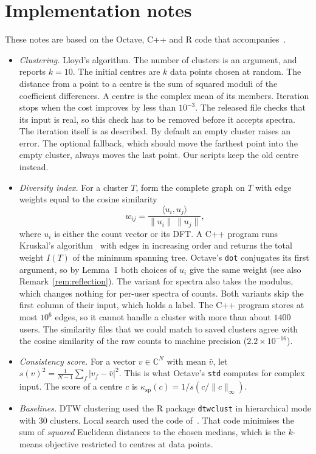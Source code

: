 \documentclass[11pt]{article}
\newcommand{\C}{\mathbb{C}}
\newcommand{\ip}[2]{\langle #1, #2 \rangle}
\newcommand{\norm}[1]{\lVert #1 \rVert}
\theoremstyle{remark}\newtheorem{remark}{Remark}\renewcommand{\theremark}{S\arabic{remark}}
\begin{document}
\section{Implementation notes}\label{s:impl}
These notes are based on the Octave, C++ and R code that accompanies~\cite{sinha2020hierarchical}.
\begin{itemize}
\item \emph{Clustering.} Lloyd's algorithm. The number of clusters is an argument, and~\cite{sinha2020hierarchical} reports $k=10$. The initial centres are $k$ data points chosen at random. The distance from a point to a centre is the sum of squared moduli of the coefficient differences. A centre is the complex mean of its members. Iteration stops when the cost improves by less than $10^{-3}$. The released file checks that its input is real, so this check has to be removed before it accepts spectra. The iteration itself is as described. By default an empty cluster raises an error. The optional fallback, which should move the farthest point into the empty cluster, always moves the last point. Our scripts keep the old centre instead.
\item \emph{Diversity index.} For a cluster $T$, form the complete graph on $T$ with edge weights equal to the cosine similarity
\[
  w_{ij}=\frac{\ip{u_i}{u_j}}{\norm{u_i}\,\norm{u_j}},
\]
where $u_i$ is either the count vector or its DFT. A C++ program runs Kruskal's algorithm~\cite{kruskal1956shortest} with edges in increasing order and returns the total weight $I(T)$ of the minimum spanning tree. Octave's \texttt{dot} conjugates its first argument, so by Lemma~1 both choices of $u_i$ give the same weight (see also Remark~\ref{rem:reflection}). The variant for spectra also takes the modulus, which changes nothing for per-user spectra of counts. Both variants skip the first column of their input, which holds a label. The C++ program stores at most $10^6$ edges, so it cannot handle a cluster with more than about $1400$ users. The similarity files that we could match to saved clusters agree with the cosine similarity of the raw counts to machine precision ($2.2\times10^{-16}$).
\item \emph{Consistency score.} For a vector $v\in\C^N$ with mean $\bar v$, let $s(v)^2=\frac1{N-1}\sum_f|v_f-\bar v|^2$. This is what Octave's \texttt{std} computes for complex input. The score of a centre $c$ is $\kappa_{\mathrm{sp}}(c)=1/s(c/\norm{c}_\infty)$.
\item \emph{Baselines.} DTW clustering used the R package \texttt{dtwclust} in hierarchical mode with $30$ clusters. Local search used the code of~\cite{ocallaghan2002streaming}. That code minimises the sum of \emph{squared} Euclidean distances to the chosen medians, which is the $k$-means objective restricted to centres at data points.
\end{itemize}
\end{document}
